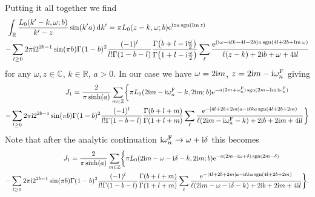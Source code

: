 \documentclass[english, parskip=full]{scrartcl}
\begin{document}
Putting it all together we find
\begin{align}
\intr{\frac{L_0(k'-k,\omega;b)}{k'-z} \sin(k'a)}{k'} &= \pi L_0(z-k,\omega;b) \powe{\i za \sgn (\Im z)}\\
-\sum_{l\ge 0}2\pi\i 2^{2b-1}\sin(\pi b) \Gamma(1-b)^2 &  \frac{(-1)^l}{l!\Gamma(1-b-l)} \frac{\Gamma\kla*{b + l-\i \frac{\omega}{2}}}{\Gamma\kla*{1+l-\i\frac{\omega}{2}}} \sum_\ell \frac{\powe{(\i \omega - \i \ell k - 4l-2b) a \sgn \kla*{4 l + 2 b + \Im\omega}}}{\ell (z-k) + 2\i b + \omega + 4\i l}
\end{align}
for any $\omega,z\in\mathbb{C}$, $k\in\mathbb{R}$, $a>0$.
In our case we have $\omega=2\text{i} m$, $z=2\text{i} m - \text{i}\omega_n^{\text{F}}$ giving
\begin{align}
J_1 &= \frac{2}{\pi \sinh(a)} \sum_{m\in\mathbb{Z}} \klc[\bigg]{\pi L_0(2\i m - \i\omega_n^\F-k,2\i m;b) \powe{- a(2m + \omega_n^\F)\sgn(2m - \Im \i \omega_n^\F)}\\
-\sum_{l\ge 0}2\pi\i 2^{2b-1}\sin(\pi b) & \Gamma(1-b)^2 \frac{(-1)^l}{l!\Gamma(1-b-l)} \frac{\Gamma\kla*{b + l+m}}{\Gamma\kla*{1+l+m}} \sum_\ell \frac{\powe{-\abs*{4l+2b+2m} a - \i \ell k a \sgn \kla*{4 l + 2 b + 2m}}}{\ell (2\i m - \i\omega_n^\F-k) + 2\i b + 2\i m + 4\i l}}
\end{align}
Note that after the analytic continuation $\text{i}\omega_n^{\text{F}} \rightarrow \omega+\text{i}\delta$ this becomes
\begin{align}
J_1 &= \frac{2}{\pi \sinh(a)} \sum_{m\in\mathbb{Z}} \klc[\bigg]{\pi L_0(2\i m - \omega - \i \delta -k,2\i m;b) \powe{- a(2m -\i\omega + \delta)\sgn(2m - \delta)}\\
-\sum_{l\ge 0}2\pi\i 2^{2b-1}\sin(\pi b) & \Gamma(1-b)^2 \frac{(-1)^l}{l!\Gamma(1-b-l)} \frac{\Gamma\kla*{b + l+m}}{\Gamma\kla*{1+l+m}} \sum_\ell \frac{\powe{-\abs*{4l+2b+2m} a - \i \ell k a \sgn \kla*{4 l + 2 b + 2m}}}{\ell (2\i m - \omega - \i\delta -k) + 2\i b + 2\i m + 4\i l}}.
\end{align}
\end{document}
